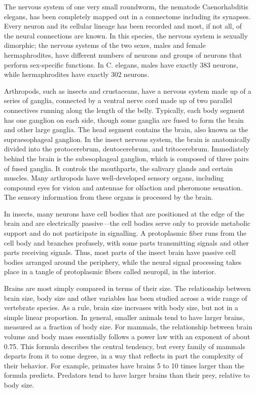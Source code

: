 \documentclass[]{book}
\begin{document}
The nervous system of one very small roundworm, the nematode Caenorhabditis elegans, has been completely mapped out in a connectome including its synapses. Every neuron and its cellular lineage has been recorded and most, if not all, of the neural connections are known. In this species, the nervous system is sexually dimorphic; the nervous systems of the two sexes, males and female hermaphrodites, have different numbers of neurons and groups of neurons that perform sex-specific functions. In C. elegans, males have exactly 383 neurons, while hermaphrodites have exactly 302 neurons.

Arthropods, such as insects and crustaceans, have a nervous system made up of a series of ganglia, connected by a ventral nerve cord made up of two parallel connectives running along the length of the belly. Typically, each body segment has one ganglion on each side, though some ganglia are fused to form the brain and other large ganglia. The head segment contains the brain, also known as the supraesophageal ganglion. In the insect nervous system, the brain is anatomically divided into the protocerebrum, deutocerebrum, and tritocerebrum. Immediately behind the brain is the subesophageal ganglion, which is composed of three pairs of fused ganglia. It controls the mouthparts, the salivary glands and certain muscles. Many arthropods have well-developed sensory organs, including compound eyes for vision and antennae for olfaction and pheromone sensation. The sensory information from these organs is processed by the brain.

In insects, many neurons have cell bodies that are positioned at the edge of the brain and are electrically passive---the cell bodies serve only to provide metabolic support and do not participate in signalling. A protoplasmic fiber runs from the cell body and branches profusely, with some parts transmitting signals and other parts receiving signals. Thus, most parts of the insect brain have passive cell bodies arranged around the periphery, while the neural signal processing takes place in a tangle of protoplasmic fibers called neuropil, in the interior.

Brains are most simply compared in terms of their size. The relationship between brain size, body size and other variables has been studied across a wide range of vertebrate species. As a rule, brain size increases with body size, but not in a simple linear proportion. In general, smaller animals tend to have larger brains, measured as a fraction of body size. For mammals, the relationship between brain volume and body mass essentially follows a power law with an exponent of about 0.75. This formula describes the central tendency, but every family of mammals departs from it to some degree, in a way that reflects in part the complexity of their behavior. For example, primates have brains 5 to 10 times larger than the formula predicts. Predators tend to have larger brains than their prey, relative to body size.
\end{document}
